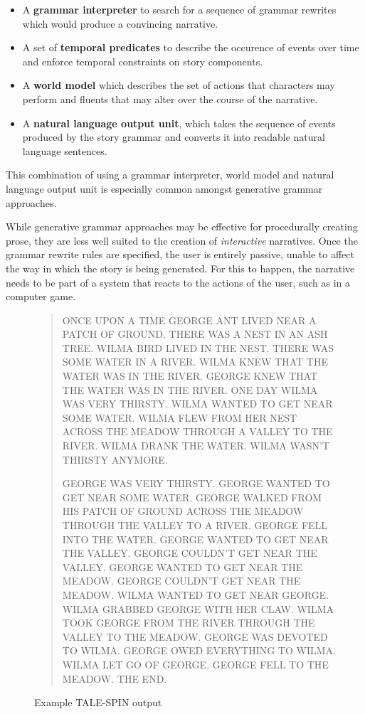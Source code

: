 \documentclass[11pt]{report}
\begin{document}
\begin{itemize}
  \item A \textbf{grammar interpreter} to search for a sequence of grammar rewrites which would produce a convincing narrative.
  \item A set of \textbf{temporal predicates} to describe the occurence of events over time and enforce temporal constraints on story components.
  \item A \textbf{world model} which describes the set of actions that characters may perform and fluents that may alter over the course of the narrative.
  \item A \textbf{natural language output unit}, which takes the sequence of events produced by the story grammar and converts it into readable natural language sentences.
\end{itemize}

This combination of using a grammar interpreter, world model and natural language output unit is especially common amongst generative grammar approaches.

While generative grammar approaches may be effective for procedurally creating
prose, they are less well suited to the creation of \emph{interactive}
narratives. Once the grammar rewrite rules are specified, the user is entirely
passive, unable to affect the way in which the story is being generated. For
this to happen, the narrative needs to be part of a system that reacts to the
actions of the user, such as in a computer game.

\begin{figure}[!t]
\begin{quote}
  ONCE UPON A TIME GEORGE ANT LIVED NEAR A PATCH OF GROUND. THERE WAS A NEST IN AN ASH TREE. WILMA BIRD LIVED IN THE NEST. THERE WAS SOME WATER IN A RIVER. WILMA KNEW THAT THE WATER WAS IN THE RIVER. GEORGE KNEW THAT THE WATER WAS IN THE RIVER. ONE DAY WILMA WAS VERY THIRSTY. WILMA WANTED TO GET NEAR SOME WATER. WILMA FLEW FROM HER NEST ACROSS THE MEADOW THROUGH A VALLEY TO THE RIVER. WILMA DRANK THE WATER. WILMA WASN'T THIRSTY ANYMORE.

GEORGE WAS VERY THIRSTY. GEORGE WANTED TO GET NEAR SOME WATER. GEORGE WALKED FROM HIS PATCH OF GROUND ACROSS THE MEADOW THROUGH THE VALLEY TO A RIVER. GEORGE FELL INTO THE WATER. GEORGE WANTED TO GET NEAR THE VALLEY. GEORGE COULDN'T GET NEAR THE VALLEY. GEORGE WANTED TO GET NEAR THE MEADOW. GEORGE COULDN'T GET NEAR THE MEADOW. WILMA WANTED TO GET NEAR GEORGE. WILMA GRABBED GEORGE WITH HER CLAW. WILMA TOOK GEORGE FROM THE RIVER THROUGH THE VALLEY TO THE MEADOW. GEORGE WAS DEVOTED TO WILMA. GEORGE OWED EVERYTHING TO WILMA. WILMA LET GO OF GEORGE. GEORGE FELL TO THE MEADOW. THE END.
\end{quote}
\caption{Example TALE-SPIN output}\label{fig:tspin}
\end{figure}
\end{document}
